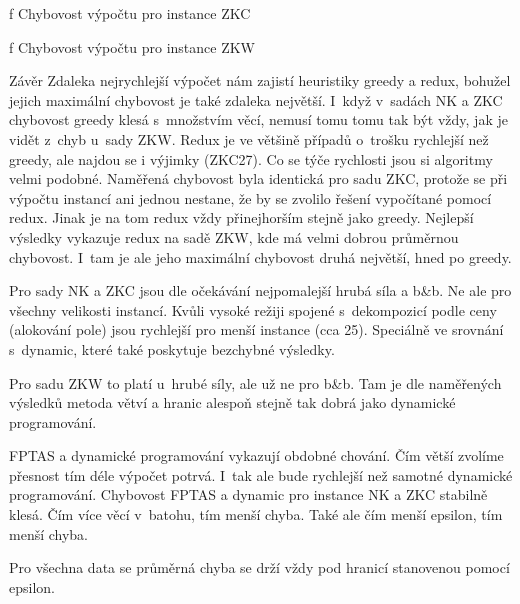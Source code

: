 \centerline{\picwidth=14cm  }
\caption/f Chybovost výpočtu pro instance ZKC
\endinsert

\centerline{\picwidth=14cm  }
\caption/f Chybovost výpočtu pro instance ZKW







\sec Závěr
Zdaleka nejrychlejší výpočet nám zajistí heuristiky greedy a redux, bohužel jejich maximální chybovost je také zdaleka největší. I~když v~sadách NK a ZKC chybovost greedy klesá s~množstvím věcí, nemusí tomu tomu tak být vždy, jak je vidět z~chyb u~sady ZKW. Redux je ve většině případů o~trošku rychlejší než greedy, ale najdou se i výjimky (ZKC27). Co se týče rychlosti jsou si algoritmy velmi podobné. Naměřená chybovost byla identická pro sadu ZKC, protože se při výpočtu instancí ani jednou nestane, že by se zvolilo řešení vypočítané pomocí redux. Jinak je na tom redux vždy přinejhorším stejně jako greedy. Nejlepší výsledky vykazuje redux na sadě ZKW, kde má velmi dobrou průměrnou chybovost. I~tam je ale jeho maximální chybovost druhá největší, hned po greedy.

Pro sady NK a ZKC jsou dle očekávání nejpomalejší hrubá síla a b\&b. Ne ale pro všechny velikosti instancí. Kvůli vysoké režiji spojené s~dekompozicí podle ceny (alokování pole) jsou rychlejší pro menší instance (cca 25). Speciálně ve srovnání s~dynamic, které také poskytuje bezchybné výsledky.

Pro sadu ZKW to platí u~hrubé síly, ale už ne pro b\&b. Tam je dle naměřených výsledků metoda větví a hranic alespoň stejně tak dobrá jako dynamické programování.

FPTAS a dynamické programování vykazují obdobné chování. Čím větší zvolíme přesnost tím déle výpočet potrvá. I~tak ale bude rychlejší než samotné dynamické programování. Chybovost FPTAS a dynamic pro instance NK a ZKC stabilně klesá. Čím více věcí v~batohu, tím menší chyba. Také ale čím menší epsilon, tím menší chyba.

Pro všechna data se průměrná chyba se drží vždy pod hranicí stanovenou pomocí epsilon.

\bye
